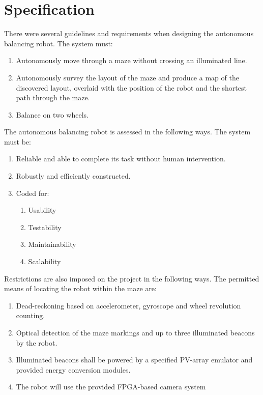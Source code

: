 
\section{Specification}

There were several guidelines and requirements when designing the autonomous balancing robot.
The system must:
\begin{enumerate}
    \item Autonomously move through a maze without crossing an illuminated line.
    \item Autonomously survey the layout of the maze and produce a map of the discovered layout, overlaid with the position of the robot and the shortest path through the maze.
    \item Balance on two wheels.
\end{enumerate}


The autonomous balancing robot is assessed in the following ways.
The system must be:
\begin{enumerate}
    \item Reliable and able to complete its task without human intervention.
    \item Robustly and efficiently constructed.
    \item Coded for:
          \begin{enumerate}[label=\alph*.]
              \item Usability
              \item Testability
              \item Maintainability
              \item Scalability
          \end{enumerate}
\end{enumerate}



Restrictions are also imposed on the project in the following ways.
The permitted means of locating the robot within the maze are:
\begin{enumerate}
    \item Dead-reckoning based on accelerometer, gyroscope and wheel revolution counting.
    \item Optical detection of the maze markings and up to three illuminated beacons by the robot.
    \item Illuminated beacons shall be powered by a specified PV-array emulator and provided energy conversion modules.
    \item The robot will use the provided FPGA-based camera system
\end{enumerate}

